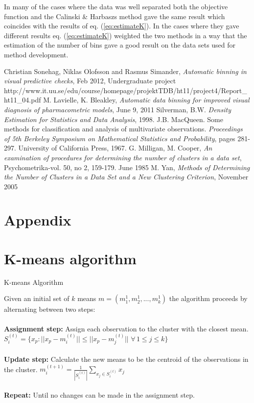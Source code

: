 In many of the cases where the data was well separated both the objective function and the Calinski \& Harbaszs method gave the same result which coincides with the results of eq. (\ref{eq:estimateK}). In the cases where they gave different results eq. (\ref{eq:estimateK}) weighted the two methods in a way that the estimation of the number of bins gave a good result on the data sets used for method development.

\begin{thebibliography}{99}
	 Christian Sonehag, Niklas Olofsson and Rasmus Simander, {\em Automatic binning in visual predictive checks}, Feb 2012, Undergraduate project http://www.it.uu.se/edu/course/homepage/projektTDB/ht11/project4/Report\_ht11\_04.pdf
  M. Lavielle, K. Bleakley, {\em Automatic data binning for improved visual diagnosis of pharmacometric models}, June 9, 2011
  Silverman, B.W. {\em Density Estimation for Statistics and Data Analysis}, 1998.
  J.B. MacQueen. Some methods for classification and analysis of multivariate observations. {\em Proceedings of 5th Berkeley Symposium on Mathematical Statistics and Probability}, pages 281-297. University of California Press, 1967.
  G. Milligan, M. Cooper, {\em An examination of procedures for determining the number of clusters in a data set}, Psychometrika-vol. 50, no 2, 159-179. June 1985
  M. Yan, {\em Methods of Determining the Number of Clusters in a Data Set and a New Clustering Criterion}, November 2005
\end{thebibliography}


\pagebreak
\appendix
\section*{Appendix}

\section{K-means algorithm}

\begin{algorithm}
	\caption{K-means Algorithm}
	Given an initial set of $k$ means $m = (m_1^1, m_2^1, ..., m_k^1)$ the algorithm proceeds by alternating between two steps:
	\\ 
	\\
	{\bf Assignment step: } Assign each observation to the cluster with the closest mean.
	$S_i^{(t)} = \{ x_p : || x_p - m_i^{(t)} || \leq || x_p - m_j^{(t)} || \,\, \forall \, 1 \leq j \leq k \}$ 
	\\
	\\
	{\bf Update step: } Calculate the new means to be the centroid of the observations in the cluster.
	$m_i^{(t+1)} = \frac{1}{| S_i^{(t)} |} \sum_{x_j \in S_i^{(t)}} x_j$
	\\
	\\
	{\bf Repeat: } Until no changes can be made in the assignment step.


\label{kmeans}
	   
\end{algorithm}


